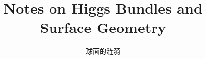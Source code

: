 \documentclass[12pt,a4paper]{article}
\newlength{\tocupshift}
\begin{document}
\title{Notes on Higgs Bundles and Surface Geometry}
\author{球面的涟漪}
\date{}
\maketitle
\vspace*{\tocupshift}
\tableofcontents

\newpage

\setcounter{section}{0}  %

% 
% 
% 
% 
% 
% 
% 
% 

% 
\end{document}
